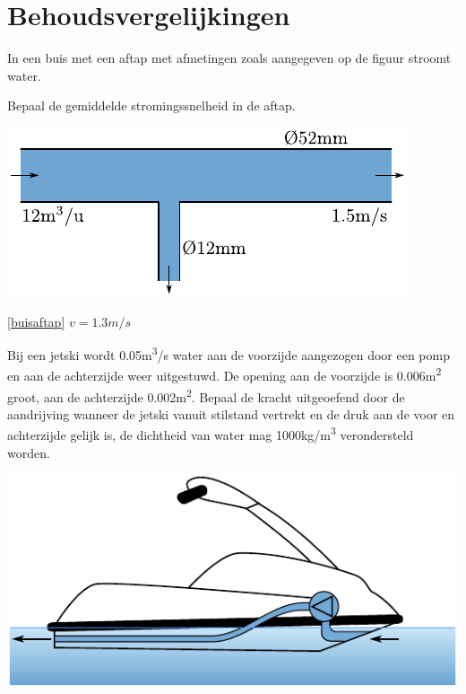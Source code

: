 \chapter{Behoudsvergelijkingen}
\label{sec:Behoudsvergelijkingen}
\begin{toepassing}
	\label{buisaftap}
In een buis met een aftap met afmetingen zoals aangegeven op de figuur stroomt water.
		
Bepaal de gemiddelde stromingssnelheid in de aftap.

	\centering
	\includegraphics{fig/behoudsvergelijkingen/buisaftap}
\end{toepassing}
\begin{antwoord}{\ref{buisaftap}}
	$v = 1.3\unit{m/s}$
\end{antwoord}
\begin{toepassing}
	\label{jetski}
Bij een jetski wordt 0.05\unit{m^3/s} water aan de voorzijde aangezogen door een pomp en aan de achterzijde weer uitgestuwd. De opening aan de voorzijde is 0.006\unit{m^2} groot, aan de achterzijde 0.002\unit{m^2}. Bepaal de kracht uitgeoefend door de aandrijving wanneer de jetski vanuit stilstand vertrekt en de druk aan de voor en achterzijde gelijk is, de dichtheid van water mag 1000\unit{kg/m^3} verondersteld worden.

	\centering
	\includegraphics{fig/behoudsvergelijkingen/jetski}
\end{toepassing}
